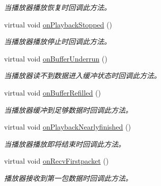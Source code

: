\begin{DoxyCompactItemize}
\begin{DoxyCompactList}\small\item\em 当播放器播放恢复时回调此方法。 \end{DoxyCompactList}\item 
virtual void \hyperlink{classduerOSDcsSDK_1_1sdkInterfaces_1_1MediaPlayerObserverInterface_a8d1bf84a79d836f81a0271cad45320f7}{on\+Playback\+Stopped} ()
\begin{DoxyCompactList}\small\item\em 当播放器播放停止时回调此方法。 \end{DoxyCompactList}\item 
virtual void \hyperlink{classduerOSDcsSDK_1_1sdkInterfaces_1_1MediaPlayerObserverInterface_a658c20b56b62445a8b1f73a05036f7a7}{on\+Buffer\+Underrun} ()
\begin{DoxyCompactList}\small\item\em 当播放器读不到数据进入缓冲状态时回调此方法。 \end{DoxyCompactList}\item 
virtual void \hyperlink{classduerOSDcsSDK_1_1sdkInterfaces_1_1MediaPlayerObserverInterface_a608847626ca3d7e1a89d29fe58b1b21c}{on\+Buffer\+Refilled} ()
\begin{DoxyCompactList}\small\item\em 当播放器缓冲到足够数据时回调此方法。 \end{DoxyCompactList}\item 
virtual void \hyperlink{classduerOSDcsSDK_1_1sdkInterfaces_1_1MediaPlayerObserverInterface_a1dfdd4526d9fd246e931895a1227d1ad}{on\+Playback\+Nearlyfinished} ()
\begin{DoxyCompactList}\small\item\em 当播放器播放即将结束时回调此方法。 \end{DoxyCompactList}\item 
\mbox{\label{classduerOSDcsSDK_1_1sdkInterfaces_1_1MediaPlayerObserverInterface_a5ad3622df1af84c861fc02ca128e5b18}} 
virtual void \hyperlink{classduerOSDcsSDK_1_1sdkInterfaces_1_1MediaPlayerObserverInterface_a5ad3622df1af84c861fc02ca128e5b18}{on\+Recv\+Firstpacket} ()
\begin{DoxyCompactList}\small\item\em 播放器接收到第一包数据时回调此方法。 \end{DoxyCompactList}\end{DoxyCompactItemize}


